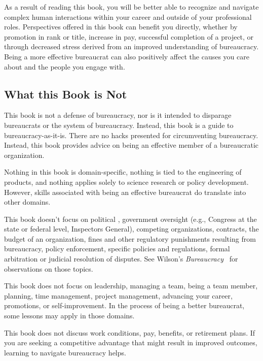 As a result of reading this book, you will be better able to recognize and navigate complex human interactions within your career and outside of your professional roles. Perspectives offered in this book can benefit you directly, whether by promotion in rank or title, increase in pay, successful completion of a project, or through decreased stress derived from an improved understanding of  bureaucracy. Being a more effective bureaucrat can also positively affect the causes you care about and the people you engage with.


\subsection*{What this Book is Not}

This book is not a defense of bureaucracy, nor is it intended to disparage bureaucrats or the system of bureaucracy. Instead, this book is a guide to bureaucracy-as-it-is. There are no hacks presented for circumventing bureaucracy. Instead, this book provides advice on being an effective member of a bureaucratic organization.

Nothing in this book is domain-specific, nothing is tied to the engineering of products, and nothing applies solely to science research or policy development. However, skills associated with being an effective bureaucrat do translate into other domains.

This book doesn't focus on political 
\iftoggle{glossarysubstitutionworks}{\glspl{policymaker}}{policymakers}, government oversight (e.g., Congress at the state or federal level, Inspectors General), 
competing organizations, contracts, the budget of an organization, fines and other regulatory punishments resulting from bureaucracy, policy enforcement, specific policies and regulations, formal arbitration or judicial resolution of disputes. See Wilson's \textit{Bureaucracy}~\cite{1991_Wilson} for observations on those topics. 


This book does not focus on leadership, managing a team, being a team member, planning, time management, project management, advancing your career, promotions, or self-improvement. In the process of being a better bureaucrat, some lessons may apply in those domains.


This book does not discuss work conditions, pay, benefits, or retirement plans. If you are seeking a competitive advantage that might result in improved outcomes, learning to navigate bureaucracy helps.


